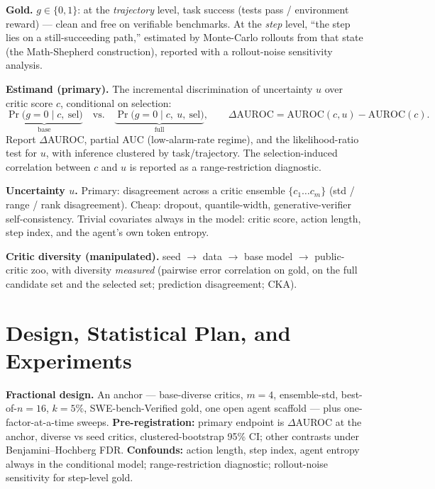 \documentclass[11pt]{article}
\begin{document}
\textbf{Gold.} $g\in\{0,1\}$: at the \emph{trajectory} level, task success (tests
pass / environment reward) --- clean and free on verifiable benchmarks. At the
\emph{step} level, ``the step lies on a still-succeeding path,'' estimated by
Monte-Carlo rollouts from that state (the Math-Shepherd construction), reported with
a rollout-noise sensitivity analysis.

\textbf{Estimand (primary).} The incremental discrimination of uncertainty $u$ over
critic score $c$, conditional on selection:
\[
\underbrace{\Pr\!\big(g{=}0 \mid c,\ \mathrm{sel}\big)}_{\text{base}}
\quad\text{vs.}\quad
\underbrace{\Pr\!\big(g{=}0 \mid c,\ u,\ \mathrm{sel}\big)}_{\text{full}},
\qquad
\Delta\mathrm{AUROC} = \mathrm{AUROC}(c,u) - \mathrm{AUROC}(c).
\]
Report $\Delta$AUROC, partial AUC (low-alarm-rate regime), and the likelihood-ratio
test for $u$, with inference clustered by task/trajectory. The selection-induced
correlation between $c$ and $u$ is reported as a range-restriction diagnostic.

\textbf{Uncertainty $u$.} Primary: disagreement across a critic ensemble
$\{c_1\dots c_m\}$ (std / range / rank disagreement). Cheap: dropout, quantile-width,
generative-verifier self-consistency. Trivial covariates always in the model: critic
score, action length, step index, and the agent's own token entropy.

\textbf{Critic diversity (manipulated).} seed $\to$ data $\to$ base model $\to$
public-critic zoo, with diversity \emph{measured} (pairwise error correlation on
gold, on the full candidate set and the selected set; prediction disagreement; CKA).

\section{Design, Statistical Plan, and Experiments}
\textbf{Fractional design.} An anchor --- base-diverse critics, $m{=}4$,
ensemble-std, best-of-$n{=}16$, $k{=}5\%$, SWE-bench-Verified gold, one open agent
scaffold --- plus one-factor-at-a-time sweeps. \textbf{Pre-registration:} primary
endpoint is $\Delta$AUROC at the anchor, diverse vs seed critics, clustered-bootstrap
95\% CI; other contrasts under Benjamini--Hochberg FDR. \textbf{Confounds:} action
length, step index, agent entropy always in the conditional model; range-restriction
diagnostic; rollout-noise sensitivity for step-level gold.
\end{document}
